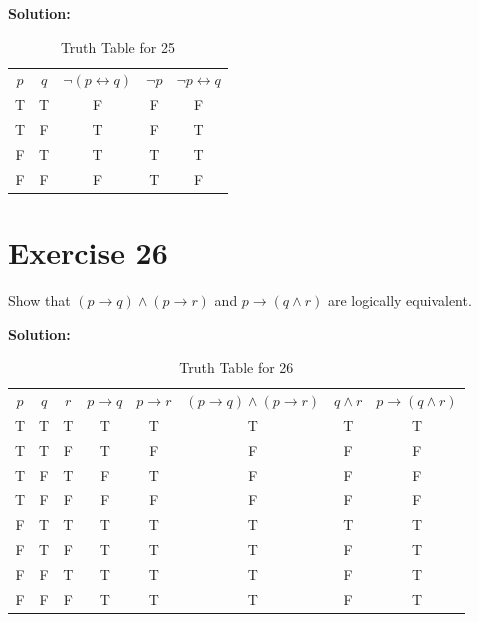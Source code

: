 \documentclass{Axon}
\begin{document}
\noindent
\textbf{Solution:}
\begin{table}[ht]
    \centering
    \begin{tabular}{c|c|c|c|c}
        \(p\) & \(q\) & \(\lnot(p \leftrightarrow q)\) & \(\lnot p\) & \(\lnot p \leftrightarrow q\) \\
        T     & T     & F                              & F           & F                             \\
        T     & F     & T                              & F           & T                             \\
        F     & T     & T                              & T           & T                             \\
        F     & F     & F                              & T           & F
    \end{tabular}
    \caption{Truth Table for 25}
\end{table}

\section*{Exercise 26}
Show that \((p \to q) \land (p \to r)\) and \(p \to (q \land r)\) are logically equivalent.

\noindent
\textbf{Solution:}
\begin{table}[ht]
    \centering
    \begin{tabular}{c|c|c|c|c|c|c|c}
        \(p\) & \(q\) & \(r\) & \(p \to q\) & \(p \to r\) & \((p \to q) \land (p \to r)\) & \(q \land r\) & \(p \to (q \land r)\) \\
        T     & T     & T     & T           & T           & T                             & T             & T                     \\
        T     & T     & F     & T           & F           & F                             & F             & F                     \\
        T     & F     & T     & F           & T           & F                             & F             & F                     \\
        T     & F     & F     & F           & F           & F                             & F             & F                     \\
        F     & T     & T     & T           & T           & T                             & T             & T                     \\
        F     & T     & F     & T           & T           & T                             & F             & T                     \\
        F     & F     & T     & T           & T           & T                             & F             & T                     \\
        F     & F     & F     & T           & T           & T                             & F             & T                     \\
    \end{tabular}
    \caption{Truth Table for 26}
\end{table}

\printbibliography
\end{document}
